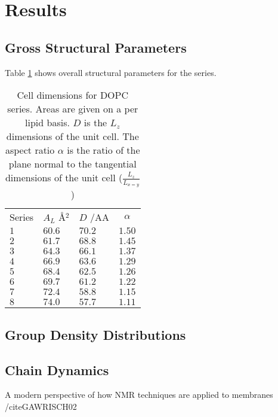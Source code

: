 \documentclass[doublespacing]{elsart}
\begin{document}
\section{Results}

\subsection{Gross Structural Parameters}
Table \ref{tab:series_params} shows overall structural parameters for the series.

\begin{table}[p]
\begin{tabular}{llll}
\multicolumn{1}{c}{Series}&
\multicolumn{1}{c}{$A_L$ {\AA$^2$}}&
\multicolumn{1}{c}{$D$ {/AA}}&
\multicolumn{1}{c}{$\alpha$} \\
$ 1 $   & $ 60.6 $  & $ 70.2  $     & $ 1.50 $          \\
$ 2 $   & $ 61.7 $  & $ 68.8  $     & $ 1.45 $          \\
$ 3 $   & $ 64.3 $  & $ 66.1  $     & $ 1.37 $          \\
$ 4 $   & $ 66.9 $  & $ 63.6  $     & $ 1.29 $          \\
$ 5 $   & $ 68.4 $  & $ 62.5  $     & $ 1.26 $          \\
$ 6 $   & $ 69.7 $  & $ 61.2  $     & $ 1.22 $          \\
$ 7 $   & $ 72.4 $  & $ 58.8  $     & $ 1.15 $          \\
$ 8 $   & $ 74.0 $  & $ 57.7  $     & $ 1.11 $          \\
\hline
\end{tabular}
\caption{Cell dimensions for DOPC series. Areas are given on a per
  lipid basis. $D$ is the $L_z$ dimensions of the unit cell. The aspect
  ratio $\alpha$ is the ratio of the plane normal to the tangential
  dimensions of the unit cell ($\frac {L_z} {L_{x=y}} $)}  
\label{tab:series_params}
\end{table}

\subsection{Group Density Distributions}

\subsection{Chain Dynamics}

A modern perspective of how NMR techniques are applied to membranes /cite{GAWRISCH02}
\end{document}
